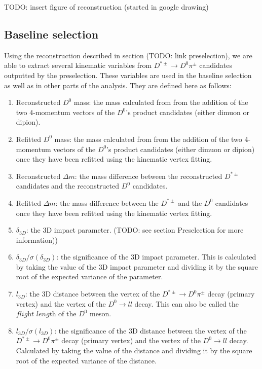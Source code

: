 TODO: insert figure of reconstruction (started in google drawing)

\subsection{Baseline selection}

Using the reconstruction described in section (TODO: link preselection), we are able to extract several kinematic variables from $D^{*\pm} \to D^0 \pi^\pm$ candidates outputted by the preselection. These variables are used in the baseline selection as well as in other parts of the analysis. They are defined here as follows:
\begin{enumerate}
    \item Reconstructed $D^0$ mass: the mass calculated from from the addition of the two 4-momentum vectors of the $D^0$'s product candidates (either dimuon or dipion). 
    \item Refitted $D^0$ mass: the mass calculated from from the addition of the two 4-momentum vectors of the $D^0$'s product candidates (either dimuon or dipion) once they have been refitted using the kinematic vertex fitting. 
    \item Reconstructed $\Delta m$: the mass difference between the reconstructed $D^{*\pm}$ candidates and the reconstructed $D^0$ candidates. 
    \item Refitted $\Delta m$: the mass difference between the $D^{*\pm}$ and the $D^0$ candidates once they have been refitted using the kinematic vertex fitting.
    \item $\delta_{3D}$: the 3D impact parameter. (TODO: see section Preselection for more information))
    \item $\delta_{3D}/\sigma\left(\delta_{3D}\right)$: the significance of the 3D impact parameter. This is calculated by taking the value of the 3D impact parameter and dividing it by the square root of the expected variance of the parameter. 
    \item $l_{3D}$: the 3D distance between the vertex of the $D^{*\pm} \to D^0 \pi^\pm$ decay (primary vertex) and the vertex of the $D^0 \to l l$ decay. This can also be called the $\textit{flight length}$ of the $D^0$ meson. 
    \item $l_{3D}/\sigma\left(l_{3D}\right)$: the significance of the 3D distance between the vertex of the $D^{*\pm} \to D^0 \pi^\pm$ decay (primary vertex) and the vertex of the $D^0 \to l l$ decay. Calculated by taking the value of the distance and dividing it by the square root of the expected variance of the distance. 

\end{enumerate}
